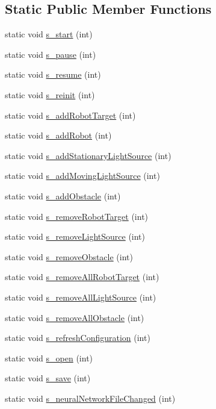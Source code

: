 \subsection*{Static Public Member Functions}
\begin{DoxyCompactItemize}
\item 
static void \hyperlink{classSimulation_a4fbdc741b91e30e8ae6660e0df440b0f}{s\-\_\-start} (int)
\item 
static void \hyperlink{classSimulation_a5f23f02ab2ff4908179428b679cd35e0}{s\-\_\-pause} (int)
\item 
static void \hyperlink{classSimulation_a488913a8c9940626ae33fbb46fcaa3ba}{s\-\_\-resume} (int)
\item 
static void \hyperlink{classSimulation_a410d482c16331e1e6de5ba3543ccedf1}{s\-\_\-reinit} (int)
\item 
static void \hyperlink{classSimulation_a8809bedf93cf98b14595606702dac2ea}{s\-\_\-add\-Robot\-Target} (int)
\item 
static void \hyperlink{classSimulation_af58dab21fe89ca343e68143663a4c02b}{s\-\_\-add\-Robot} (int)
\item 
static void \hyperlink{classSimulation_a81fd62337fe6091c4a10277f24d3283e}{s\-\_\-add\-Stationary\-Light\-Source} (int)
\item 
static void \hyperlink{classSimulation_a6712136802456306afa232fc50999494}{s\-\_\-add\-Moving\-Light\-Source} (int)
\item 
static void \hyperlink{classSimulation_ae27ff6c795de81dcffe7f6e0e9b2e056}{s\-\_\-add\-Obstacle} (int)
\item 
static void \hyperlink{classSimulation_a2eac6140af57c80832b96f7baeaa1541}{s\-\_\-remove\-Robot\-Target} (int)
\item 
static void \hyperlink{classSimulation_a4582e4be95ed1c5e6d56b9784c6d445d}{s\-\_\-remove\-Light\-Source} (int)
\item 
static void \hyperlink{classSimulation_ace6392d4941964d55dd015d72cd4d329}{s\-\_\-remove\-Obstacle} (int)
\item 
static void \hyperlink{classSimulation_a44d48e7718d802a3f487728088883062}{s\-\_\-remove\-All\-Robot\-Target} (int)
\item 
static void \hyperlink{classSimulation_a4a93430b4e38ab42ad0484068aa8c7ef}{s\-\_\-remove\-All\-Light\-Source} (int)
\item 
static void \hyperlink{classSimulation_a98c4456a49c4b2776376be37e9600ba6}{s\-\_\-remove\-All\-Obstacle} (int)
\item 
static void \hyperlink{classSimulation_a8f8588b5f9f96ab590e89f5635413b09}{s\-\_\-refresh\-Configuration} (int)
\item 
static void \hyperlink{classSimulation_a0ac559574b30698f53597049c90f3c54}{s\-\_\-open} (int)
\item 
static void \hyperlink{classSimulation_a8819e4930c1ff660d8a711390d7cd441}{s\-\_\-save} (int)
\item 
static void \hyperlink{classSimulation_aa517549d904986ed7862125ce22385c1}{s\-\_\-neural\-Network\-File\-Changed} (int)
\end{DoxyCompactItemize}
